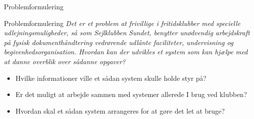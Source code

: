 \begin{frame}{Problemformulering}

\begin{beamerboxesrounded}[upper=headerCol,lower=bodyCol,shadow=true]{Problemformulering}
\textit{Det er et problem at frivillige i fritidsklubber med specielle udlejningsmuligheder, så som Sejlklubben Sundet, benytter unødvendig arbejdskraft på fysisk dokumenthåndtering vedrørende udlånte faciliteter, undervisning og begivenhedsorganisation. Hvordan kan der udvikles et system som kan hjælpe med at danne overblik over sådanne opgaver?}
\end{beamerboxesrounded}

  \begin{itemize}
      
    \item Hvilke informationer ville et sådan system skulle holde styr på?
    \item Er det muligt at arbejde sammen med systemer allerede I brug ved klubben?
    \item Hvordan skal et sådan system arrangeres for at gøre det let at bruge?
  \end{itemize}
\end{frame}